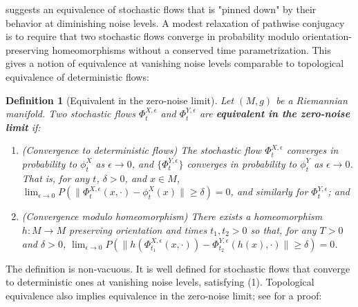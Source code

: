 \documentclass[12pt]{article}
\newtheorem{definition}[theorem]{Definition}
\begin{document}
 suggests an equivalence of stochastic flows that is "pinned down" by their behavior at diminishing noise levels. A modest relaxation of pathwise conjugacy is to require that two stochastic flows converge in probability modulo orientation-preserving homeomorphisms without a conserved time parametrization. This gives a notion of equivalence at vanishing noise levels comparable to topological equivalence of deterministic flows:

\begin{definition}[Equivalent in the zero-noise limit]
    Let $(M,g)$ be a Riemannian manifold. Two stochastic flows \( \Phi_t^{X, \epsilon} \) and \( \Phi_t^{Y, \epsilon} \) are \textbf{equivalent in the zero-noise limit} if:
\begin{enumerate}[itemsep=0pt]
    \item (Convergence to deterministic flows) The stochastic flow \( \Phi_t^{X, \epsilon} \) converges in probability to \( \phi_t^X \) as \( \epsilon \to 0 \), and \( \{\Phi_t^{Y, \epsilon}\} \) converges in probability to \( \phi_t^Y \) as \( \epsilon \to 0 \). That is, for any \( t \), \( \delta > 0 \), and $x\in M$, ${\lim_{\epsilon \to 0} P \left( \|\Phi_t^{X, \epsilon}(x, \cdot) - \phi_t^X(x)\| \geq \delta \right) = 0} $, and similarly for \( \Phi_t^{Y, \epsilon} \); and
    
    \item (Convergence modulo homeomorphism) There exists a homeomorphism $h: M \rightarrow M$ preserving orientation and times $t_1,t_2 > 0 $ so that, for any $T > 0$ and $\delta > 0$, ${\lim_{\epsilon \to 0} P \left(  \| h(\Phi_{t_1}^{X, \epsilon}(x,\cdot)) - \Phi_{t_2}^{Y, \epsilon}(h(x),\cdot) \| \geq \delta \right) = 0 }$.
\end{enumerate}
\end{definition}
The definition is non-vacuous. It is well defined for stochastic flows that converge to deterministic ones at vanishing noise levels, satisfying (1). Topological equivalence also implies equivalence in the zero-noise limit; see  for a proof:
\end{document}

